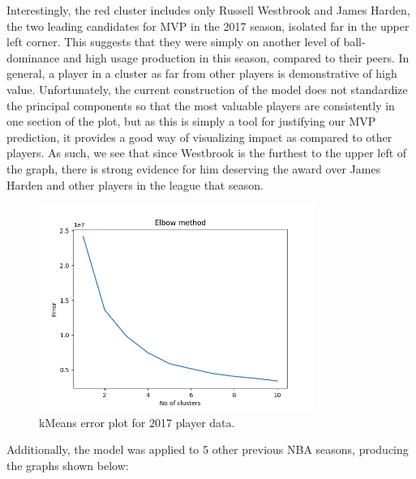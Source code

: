 \documentclass{article}
\begin{document}
Interestingly, the red cluster includes only Russell Westbrook and James Harden, the two leading candidates for MVP in the 2017 season, isolated far in the upper left corner. This suggests that they were simply on another level of ball-dominance and high usage production in this season, compared to their peers. In general, a player in a cluster as far from other players is demonstrative of high value. Unfortunately, the current construction of the model does not standardize the principal components so that the most valuable players are consistently in one section of the plot, but as this is simply a tool for justifying our MVP prediction, it provides a good way of visualizing impact as compared to other players. As such, we see that since Westbrook is the furthest to the upper left of the graph, there is strong evidence for him deserving the award over James Harden and other players in the league that season.

\begin{figure}[h]
  \centering
  \includegraphics[width=9cm]{2017_Graphs/K_Means_Error_2017.png}
  \caption{kMeans error plot for 2017 player data.}
\end{figure}

\newpage Additionally, the model was applied to 5 other previous NBA seasons, producing the graphs shown below:
\end{document}
